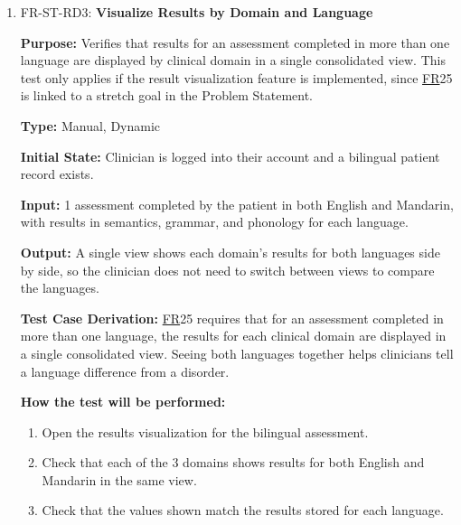 \documentclass[12pt, titlepage]{article}
\newcommand{\srsfr}[1]{\href{https://github.com/Nour-Fawaz/MacaBoca/blob/main/pdfs/SRS/SRS.pdf}{FR}}
\renewcommand{\_}{\oldunderscore\allowbreak}
\begin{document}
\begin{enumerate}
  \item FR-ST-RD3: \textbf{Visualize Results by Domain and Language\\}
  \begin{mdframed}[linewidth=0.5mm]
      \textbf{Purpose:} Verifies that results for an assessment completed in more than one language are displayed by clinical domain in a single consolidated view. This test only applies if the result visualization feature is implemented, since \srsfr*{25} is linked to a stretch goal in the Problem Statement. \par
      \textbf{Type:} Manual, Dynamic \par
      \textbf{Initial State:} Clinician is logged into their account and a bilingual patient record exists. \par
      \textbf{Input:} 1 assessment completed by the patient in both English and Mandarin, with results in semantics, grammar, and phonology for each language. \par
      \textbf{Output:} A single view shows each domain's results for both languages side by side, so the clinician does not need to switch between views to compare the languages. \par
      \textbf{Test Case Derivation:} \srsfr*{25} requires that for an assessment completed in more than one language, the results for each clinical domain are displayed in a single consolidated view. Seeing both languages together helps clinicians tell a language difference from a disorder. \par
      \textbf{How the test will be performed:}
      \begin{enumerate}
        \item[1.] Open the results visualization for the bilingual assessment.
        \item[2.] Check that each of the 3 domains shows results for both English and Mandarin in the same view.
        \item[3.] Check that the values shown match the results stored for each language.
      \end{enumerate}
  \end{mdframed}


\end{enumerate}
\end{document}
